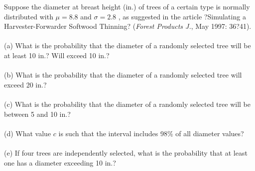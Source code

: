 \documentclass[12pt,letterpaper]{hmcpset}
\begin{document}
\begin{solution}

\end{solution}
\newpage
\begin{problem}[4.3.35]
Suppose the diameter at breast height (in.) of trees of a
certain type is normally distributed with $\mu = 8.8$ and $\sigma = 2.8$
, as suggested in the article ?Simulating a
Harvester-Forwarder Softwood Thinning? (\textit{Forest
Products J.}, May 1997: 36?41).\\
\\(a) What is the probability that the diameter of a randomly
selected tree will be at least 10 in.? Will exceed
10 in.?\\
\\(b) What is the probability that the diameter of a randomly
selected tree will exceed 20 in.?\\
\\(c) What is the probability that the diameter of a randomly
selected tree will be between 5 and 10 in.?\\
\\(d) What value $c$ is such that the interval
includes 98$\%$ of all diameter values?\\
\\(e) If four trees are independently selected, what is the
probability that at least one has a diameter exceeding
10 in.?
\end{problem}

\begin{solution}

\end{solution}
\newpage
\end{document}
